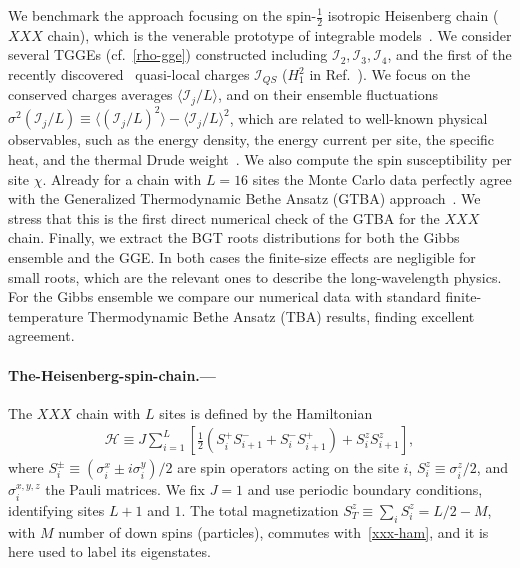 \documentclass[twocolumn,superscriptaddress,prb,10pt]{revtex4-1}
\begin{document}
We benchmark the approach focusing on the spin-$\frac{1}{2}$ isotropic 
Heisenberg chain ($XXX$ chain), which is the venerable prototype of integrable 
models~\cite{bethe-1931}. We consider several TGGEs 
(cf.~\eqref{rho-gge}) constructed including ${\mathcal I}_2,{\mathcal I}_3,
{\mathcal I}_4$, and the first of the recently discovered~\cite{ilievski-2015,ilievski-2015a} 
quasi-local charges ${\mathcal I}_{QS}$ ($H_1^2$ in Ref.~). 
We focus on the conserved charges averages $\langle{\mathcal I}_j/L\rangle$, 
and on their ensemble fluctuations $\sigma^2({\mathcal I}_j/L)\equiv\langle({\mathcal I}_j/L)^2
\rangle-\langle{\mathcal I}_j/L\rangle^2$, which  are related to well-known physical 
observables, such as the energy density, the energy current per site, the specific heat, 
and the thermal Drude weight~\cite{klumper-2002}. We also compute the spin susceptibility 
per site $\chi$. Already for a chain with $L=16$ sites the Monte Carlo data perfectly agree 
with the Generalized Thermodynamic Bethe Ansatz (GTBA) approach~\cite{mossel-2012,fagotti-2013a}. 
We stress that this is the first direct numerical check of the GTBA for the $XXX$ chain. Finally, 
we extract the BGT roots distributions for both the Gibbs ensemble and the GGE. 
In both cases the finite-size effects are negligible for small roots, which are the 
relevant ones to describe the long-wavelength physics. For the Gibbs ensemble we compare 
our numerical data with standard finite-temperature Thermodynamic Bethe Ansatz (TBA) results, 
finding excellent agreement. 


\paragraph*{The-Heisenberg-spin-chain.---}

The $XXX$ chain with $L$ sites is defined by the Hamiltonian 
%
\begin{align}
\label{xxx-ham}
{\mathcal H}\equiv J\sum\limits_{i=1}^L\left[\frac{1}{2}(S_i^+S^-_{i+1} 
+S_i^{-}S_{i+1}^+)+S_i^zS_{i+1}^z\right],  
\end{align}
%
where $S^{\pm}_i\equiv (\sigma_i^x\pm i\sigma_i^y)/2$ are spin operators acting on the 
site $i$, $S_i^z\equiv\sigma_i^z/2$, and $\sigma^{x,y,z}_i$ the Pauli matrices. We fix 
$J=1$ and use periodic boundary conditions, identifying sites $L+1$ and $1$. The total 
magnetization $S_{T}^z\equiv\sum_iS_i^z=L/2-M$, with $M$ number of down spins (particles), 
commutes with~\eqref{xxx-ham}, and it is here used to label its eigenstates. 
\end{document}

